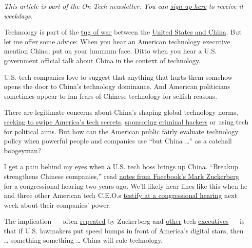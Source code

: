 \emph{This article is part of the On Tech newsletter. You can}
\href{https://www.nytimes3xbfgragh.onion/newsletters/signup/OT}{\emph{sign
up here}} \emph{to receive it weekdays.}

Technology is part of the
\href{https://www.nytimes3xbfgragh.onion/2020/07/14/world/asia/cold-war-china-us.html}{tug
of war} between the
\href{https://www.nytimes3xbfgragh.onion/2020/07/22/world/asia/us-china-houston-consulate.html}{United
States and China}. But let me offer some advice: When you hear an
American technology executive mention China, put on your hmmmm face.
Ditto when you hear a U.S. government official talk about China in the
context of technology.

U.S. tech companies love to suggest that anything that hurts them
somehow opens the door to China's technology dominance. And American
politicians sometimes appear to fan fears of Chinese technology for
selfish reasons.

There are legitimate concerns about China's shaping global technology
norms,
\href{https://www.nytimes3xbfgragh.onion/2020/01/15/business/china-technology-transfer.html}{seeking
to swipe America's tech secrets},
\href{https://www.washingtonpost.com/national-security/us-china-covid-19-vaccine-research/2020/07/21/8b6ca0c0-cb58-11ea-91f1-28aca4d833a0_story.html}{sponsoring
criminal hackers} or using tech for political aims. But how can the
American public fairly evaluate technology policy when powerful people
and companies use ``but China \ldots{}'' as a catchall boogeyman?

I get a pain behind my eyes when a U.S. tech boss brings up China.
``Breakup strengthens Chinese companies,'' read
\href{https://www.nytimes3xbfgragh.onion/2018/04/11/us/mark-zuckerberg-senate-hearing-notes.html}{notes
from Facebook's Mark Zuckerberg} for a congressional hearing two years
ago. We'll likely hear lines like this when he and three other American
tech C.E.O.s
\href{https://www.nytimes3xbfgragh.onion/2020/07/01/technology/amazon-apple-alphabet-facebook-congress-antitrust.html}{testify
at a congressional hearing} next week about their companies' power.

The implication --- often
\href{https://techcrunch.com/2019/07/17/facebook-or-china/}{repeated} by
Zuckerberg and
\href{https://www.wired.com/story/big-tech-breaking-will-only-help-china/}{other}
tech
\href{https://www.cnn.com/2019/06/14/tech/sundar-pichai-google-antitrust/index.html}{executives}
--- is that if U.S. lawmakers put speed bumps in front of America's
digital stars, then \ldots{} something something \ldots{} China will
rule technology.


